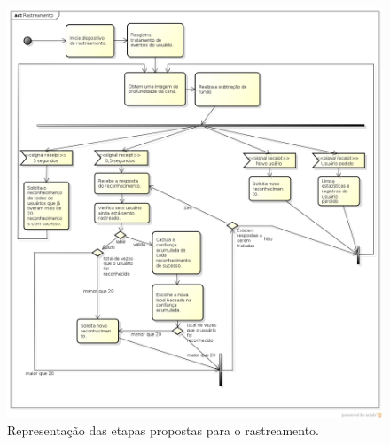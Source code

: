 	
	\begin{figure}[H]
		\begin{center}
			\includegraphics[scale=0.45]{figuras/4.ProblemaEProposta/Rastreamento.png}
		\end{center}
		\caption{Representação das etapas propostas para o rastreamento.}
		\label{fig:processo-rastreamento}
	\end{figure}
